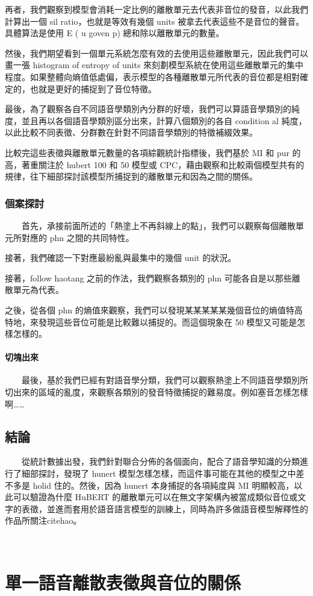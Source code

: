         再者，我們觀察到模型會消耗一定比例的離散單元去代表非音位的發音，以此我們計算出一個 sil ratio，也就是等效有幾個 units 被拿去代表這些不是音位的聲音。具體算法是使用 E ( u goven p) 總和除以離散單元的數量。

        然後，我們期望看到一個單元系統怎麼有效的去使用這些離散單元，因此我們可以畫一張 histogram of entropy of units 來刻劃模型系統在使用這些離散單元的集中程度。如果整體向熵值低處偏，表示模型的各種離散單元所代表的音位都是相對確定的，也就是更好的捕捉到了音位特徵。

        最後，為了觀察各自不同語音學類別內分群的好壞，我們可以算語音學類別的純度，並且再以各個語音學類別區分出來，計算八個類別的各自 condition al 純度，以此比較不同表徵、分群數在針對不同語音學類別的特徵補綴效果。

        比較完這些表徵與離散單元數量的各項綜觀統計指標後，我們基於 MI 和 pur 的高，著重關注於 hubert 100 和 50 模型或 CPC，藉由觀察和比較兩個模型共有的規律，往下細部探討該模型所捕捉到的離散單元和因為之間的關係。

\subsection{個案探討}  %

　　首先，承接前面所述的「熱塗上不再斜線上的點」，我們可以觀察每個離散單元所對應的 phn 之間的共同特性。

        接著，我們確認一下對應最紛亂與最集中的幾個 unit 的狀況。

        接著，follow haotang 之前的作法，我們觀察各類別的 phn 可能各自是以那些離散單元為代表。

        之後，從各個 phn 的熵值來觀察，我們可以發現某某某某某幾個音位的熵值特高特地，來發現這些音位可能是比較難以捕捉的。而這個現象在 50 模型又可能是怎樣怎樣的。

\subsubsection{切塊出來}

　　最後，基於我們已經有對語音學分類，我們可以觀察熱塗上不同語音學類別所切出來的區域的亂度，來觀察各類別的發音特徵捕捉的難易度。例如塞音怎樣怎樣啊……

\section{結論}

　　從統計數據出發，我們針對聯合分佈的各個面向，配合了語音學知識的分類進行了細部探討，發現了 hunert 模型怎樣怎樣，而這件事可能在其他的模型之中差不多是 holid 住的。然後，因為 hunert 本身捕捉的各項純度與 MI 明顯較高，以此可以驗證為什麼 HuBERT 的離散單元可以在無文字架構內被當成類似音位或文字的表徵，並進而套用於語音語言模型的訓練上，同時為許多做語音模型解釋性的作品所關注citehao。

\newpage\textcolor{white}{0}\newpage  %

\chapter{單一語音離散表徵與音位的關係}


